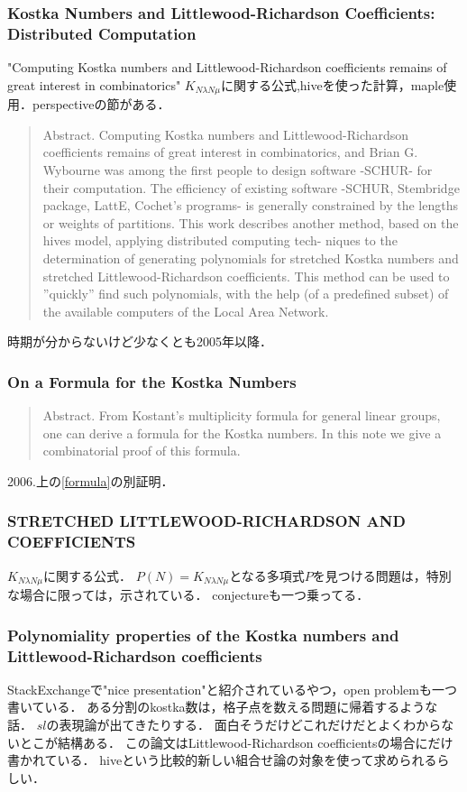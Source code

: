 \documentclass{ujarticle}[12pt,a4pepar]
\theoremstyle{jplain}
\begin{document}
\subsubsection{Kostka Numbers and Littlewood-Richardson Coefficients: Distributed Computation}
"Computing Kostka numbers and Littlewood-Richardson coefficients remains of great interest in combinatorics"
$K_{N\lambda N\mu}$に関する公式,hiveを使った計算，maple使用．perspectiveの節がある．
\begin{quotation}
  Abstract. Computing Kostka numbers and Littlewood-Richardson coefficients remains of great interest in combinatorics,
  and Brian G. Wybourne was among the first people to design software -SCHUR- for their computation.
  The efficiency of existing software -SCHUR, Stembridge package, LattE,
  Cochet’s programs- is generally constrained by the lengths or weights of partitions.
  This work describes another method, based on the hives model,
  applying distributed computing tech- niques to the determination of generating
  polynomials for stretched Kostka numbers and stretched Littlewood-Richardson coefficients.
  This method can be used to ”quickly” find such polynomials, with the help (of a predefined subset) of
  the available computers of the Local Area Network.
\end{quotation}
時期が分からないけど少なくとも2005年以降．

\subsubsection{On a Formula for the Kostka Numbers}
\begin{quotation}
  Abstract. From Kostant’s multiplicity formula for general linear groups,
  one can derive a formula for the Kostka numbers.
  In this note we give a combinatorial proof of this formula.
\end{quotation}
2006.上の\ref{formula}の別証明．

\subsubsection{STRETCHED LITTLEWOOD-RICHARDSON AND COEFFICIENTS}
$K_{N\lambda N\mu}$に関する公式．
$P(N) = K_{N\lambda N\mu}$となる多項式$P$を見つける問題は，特別な場合に限っては，示されている．
conjectureも一つ乗ってる．

\subsubsection{ Polynomiality properties of the Kostka numbers and Littlewood-Richardson coefficients}
StackExchangeで"nice presentation"と紹介されているやつ，open problemも一つ書いている．
ある分割のkostka数は，格子点を数える問題に帰着するような話．
$sl$の表現論が出てきたりする．
面白そうだけどこれだけだとよくわからないとこが結構ある．
この論文はLittlewood-Richardson coefficientsの場合にだけ書かれている．
hiveという比較的新しい組合せ論の対象を使って求められるらしい．
\end{document}
